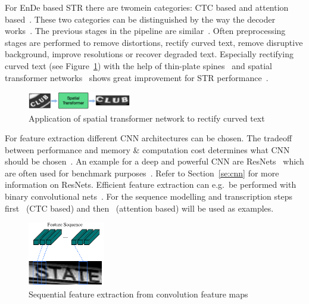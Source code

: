 For \ac{EnDe} based \ac{STR} there are twomein categories: \ac{CTC} based and attention
based~\citep{chen_text_2021}.
These two categories can be distinguished by the way the decoder works~\citep{chen_text_2021}.
The previous stages in the pipeline are similar~\citep{long_scene_2021,chen_text_2021}.
Often preprocessing stages are performed to remove distortions, rectify curved text,
remove disruptive background, improve resolutions or recover degraded text.
Especially rectifying curved text (see Figure~\ref{fig:STN-application}) with the help of
thin-plate spines~\citep{bookstein_principal_1989} and spatial transformer
networks~\citep{jaderberg_spatial_2015} shows great improvement for \ac{STR}
performance~\citep{long_scene_2021,chen_text_2021}.
\begin{figure}[h]
    \centering
    \includegraphics[width=0.4\textwidth]{img/STN-result-Liu-STAR-2016.png}
    \caption[Text rectification application]{%
        Application of spatial transformer network to rectify curved
        text~\citep{liu_star-net_2016}\label{fig:STN-application}
    }
\end{figure}
For feature extraction different \ac{CNN} architectures can be chosen.
The tradeoff between performance and memory \& computation cost determines what \ac{CNN} should be
chosen~\citep{chen_text_2021}.
An example for a deep and powerful \ac{CNN} are ResNets~\citep{he_deep_2015} which are often used
for benchmark purposes~\citep{chen_text_2021,long_scene_2021}.
Refer to Section~\ref{se:cnn} for more information on ResNets.
Efficient feature extraction can e.g.\ be performed with binary convolutional
nets~\citep{liu_squeezedtext_2018}.
For the sequence modelling and transcription steps first~\cite{shi_end--end_2017} (\ac{CTC} based)
and then~\cite{ghosh_visual_2017} (attention based) will be used as examples.
\begin{figure}[h]
    \centering
    \includegraphics[width=0.3\textwidth]{img/STR-encdec-sequence-feat.png}
    \caption[Sequential feature extraction from convolution feature maps]{%
        Sequential feature extraction from convolution feature
        maps~\citep{shi_end--end_2017}\label{fig:STR-CTC-seq-feat}
    }
\end{figure}
